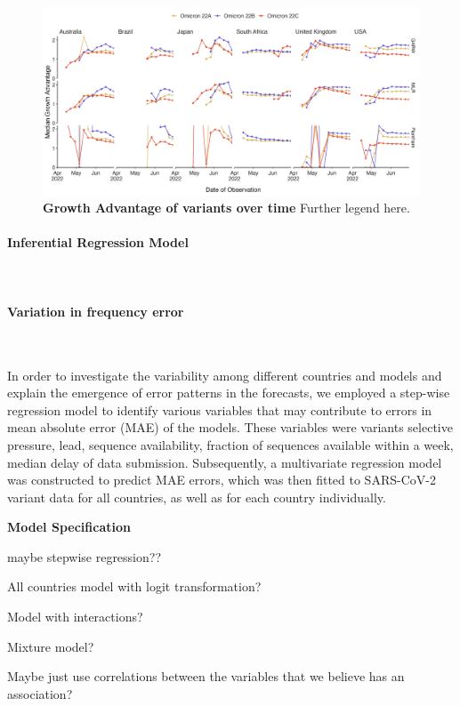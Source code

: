 \documentclass[11pt,oneside,letterpaper]{article}
\begin{document}
\begin{figure}[H]
	\centering
	\includegraphics[width=1.1\textwidth]{figures/Figure3.png}
	\caption{\textbf{Growth Advantage of variants over time}
	Further legend here.
	}
	\label{Figure 3}
\end{figure}

\paragraph{Inferential Regression Model}\


\paragraph{Variation in frequency error}\

In order to investigate the variability among different countries and models and explain the emergence of error patterns in the forecasts, we employed a step-wise regression model to identify various variables that may contribute to errors in mean absolute error (MAE) of the models.
These variables were variants selective pressure, lead, sequence availability, fraction of sequences available within a week, median delay of data submission. 
Subsequently, a multivariate regression model was constructed to predict MAE errors, which was then fitted to SARS-CoV-2 variant data for all countries, as well as for each country individually.

\textbf{Model Specification}




maybe stepwise regression??

All countries model with logit transformation?

Model with interactions?

Mixture model?

Maybe just use correlations between the variables that we believe has an association?
\end{document}
